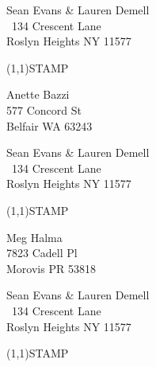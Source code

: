 \documentclass[12pt]{article}
\begin{document}
\begin{minipage}{.5\linewidth} \noindent
Sean Evans \& Lauren Demell\\\ 
134 Crescent Lane\\ 
Roslyn Heights NY 11577
\end{minipage}
\begin{minipage}{.5\linewidth \hspace{-.2in} \vspace{-.3in}}
\begin{flushright}
\framebox(1,1){STAMP}
\end{flushright}
\end{minipage}

\begin{center} \begin{Huge} \vspace*{\fill}
Anette Bazzi\\
577 Concord St\\
Belfair WA 63243\\
\vspace{\fill} \end{Huge} \end{center}

\clearpage

\begin{minipage}{.5\linewidth} \noindent
Sean Evans \& Lauren Demell\\\ 
134 Crescent Lane\\ 
Roslyn Heights NY 11577
\end{minipage}
\begin{minipage}{.5\linewidth \hspace{-.2in} \vspace{-.3in}}
\begin{flushright}
\framebox(1,1){STAMP}
\end{flushright}
\end{minipage}

\begin{center} \begin{Huge} \vspace*{\fill}
Meg Halma\\
7823 Cadell Pl\\
Morovis PR 53818\\
\vspace{\fill} \end{Huge} \end{center}

\clearpage

\begin{minipage}{.5\linewidth} \noindent
Sean Evans \& Lauren Demell\\\ 
134 Crescent Lane\\ 
Roslyn Heights NY 11577
\end{minipage}
\begin{minipage}{.5\linewidth \hspace{-.2in} \vspace{-.3in}}
\begin{flushright}
\framebox(1,1){STAMP}
\end{flushright}
\end{minipage}
\end{document}

